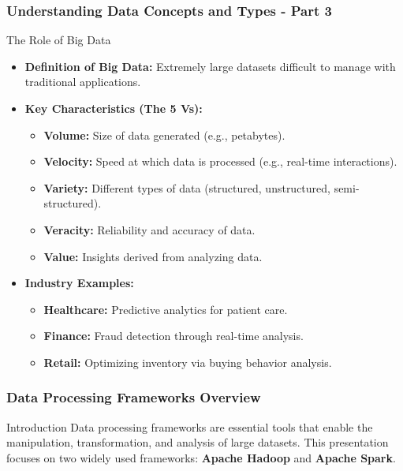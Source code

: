 \documentclass{beamer}
\begin{document}
\begin{frame}[fragile]
    \frametitle{Understanding Data Concepts and Types - Part 3}
    \begin{block}{The Role of Big Data}
        \begin{itemize}
            \item \textbf{Definition of Big Data:} Extremely large datasets difficult to manage with traditional applications.
            \item \textbf{Key Characteristics (The 5 Vs):}
                \begin{itemize}
                    \item \textbf{Volume:} Size of data generated (e.g., petabytes).
                    \item \textbf{Velocity:} Speed at which data is processed (e.g., real-time interactions).
                    \item \textbf{Variety:} Different types of data (structured, unstructured, semi-structured).
                    \item \textbf{Veracity:} Reliability and accuracy of data.
                    \item \textbf{Value:} Insights derived from analyzing data.
                \end{itemize}
            \item \textbf{Industry Examples:}
                \begin{itemize}
                    \item \textbf{Healthcare:} Predictive analytics for patient care.
                    \item \textbf{Finance:} Fraud detection through real-time analysis.
                    \item \textbf{Retail:} Optimizing inventory via buying behavior analysis.
                \end{itemize}
        \end{itemize}
    \end{block}
\end{frame}

\begin{frame}
    \titlepage
\end{frame}

\begin{frame}
    \frametitle{Data Processing Frameworks Overview}
    \begin{block}{Introduction}
        Data processing frameworks are essential tools that enable the manipulation, transformation, and analysis of large datasets. This presentation focuses on two widely used frameworks: 
        \textbf{Apache Hadoop} and \textbf{Apache Spark}.
    \end{block}
\end{frame}
\end{document}
